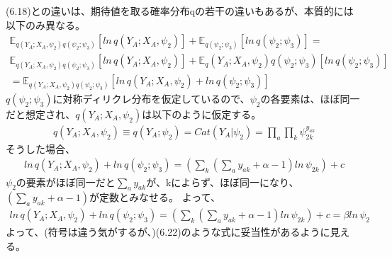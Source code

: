 ﻿\documentclass{jsarticle}
\begin{document}
(6.18)との違いは、期待値を取る確率分布qの若干の違いもあるが、本質的には以下のみ異なる。
\begin{equation}
\begin{split}
\mathbb{E}_{q(Y_A; X_A, \psi_2)q(\psi_2 ; \psi_3)} [ln \, q(Y_A; X_A, \psi_2)] + \mathbb{E}_{q(\psi_2 ; \psi_3)} [ln \, q(\psi_2 ; \psi_3)] = \\
\mathbb{E}_{q(Y_A; X_A, \psi_2)q(\psi_2 ; \psi_3)} [ln \, q(Y_A; X_A, \psi_2)] + \mathbb{E}_q(Y_A; X_A, \psi_2){q(\psi_2 ; \psi_3)} [ln \, q(\psi_2 ; \psi_3)]\\
= \mathbb{E}_{q(Y_A; X_A, \psi_2)q(\psi_2 ; \psi_3)} [ln \, q(Y_A; X_A, \psi_2) + ln \, q(\psi_2 ; \psi_3)]
\end{split}
\end{equation}
$q(\psi_2 ; \psi_3)$に対称ディリクレ分布を仮定しているので、$\psi_2$の各要素は、ほぼ同一だと想定され、$q(Y_A; X_A, \psi_2)$は以下のように仮定する。
\begin{equation}
\begin{split}
q(Y_A; X_A, \psi_2) \equiv q(Y_A; \psi_2) = Cat(Y_A | \psi_2) = \prod_a \prod_k \psi_{2k}^{y_{ak}}
\end{split}
\end{equation}
そうした場合、
\begin{equation}
\begin{split}
ln \, q(Y_A; X_A, \psi_2) + ln \, q(\psi_2 ; \psi_3)　 = (\sum_k (\sum_a y_{ak} + \alpha - 1)　ln \, \psi_{2k}) + c
\end{split}
\end{equation}
$\psi_2$の要素がほぼ同一だと$\sum_a y_{ak}$が、kによらず、ほぼ同一になり、$(\sum_a y_{ak} + \alpha - 1)$が定数とみなせる。
よって、
\begin{equation}
\begin{split}
ln \, q(Y_A; X_A, \psi_2) + ln \, q(\psi_2 ; \psi_3)　 = (\sum_k (\sum_a y_{ak} + \alpha - 1)　ln \, \psi_{2k}) + c = \beta　ln \, \psi_{2}
\end{split}
\end{equation}
よって、(符号は違う気がするが、)(6.22)のような式に妥当性があるように見える。
\end{document}
